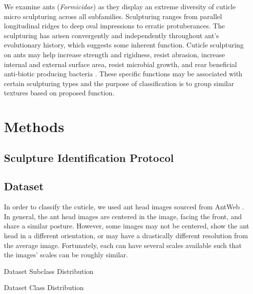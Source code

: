 \documentclass{aci}
\begin{document}
We examine ants (\textit{Formicidae}) as they display an extreme diversity of
cuticle micro sculpturing across all subfamilies. Sculpturing ranges from
parallel longitudinal ridges to deep oval impressions to erratic protuberances.
The sculpturing has arisen convergently and independently throughout ant’s
evolutionary history, which suggests some inherent function. Cuticle sculpturing
on ants may help increase strength and rigidness, resist abrasion, increase
internal and external surface area, resist microbial growth, and rear beneficial
anti-biotic producing bacteria \cite{johnson_effect_2011,
  bruckner_relationship_2017, currie_coevolved_2006}. These specific functions may
be associated with certain sculpturing types and the purpose of classification
is to group similar textures based on proposed function.

\section{Methods}

\subsection{Sculpture Identification Protocol}

\subsection{Dataset}
In order to classify the cuticle, we used ant head images sourced from AntWeb
\cite{antweb}. In general, the ant head images are centered in the image, facing
the front, and share a similar posture. However, some images may not be
centered, show the ant head in a different orientation, or may have a
drastically different resolution from the average image. Fortunately, each can
have several scales available such that the images' scales can be roughly
similar.

\begin{table}[h]
  \centering
  \caption{Dataset Subclass Distribution}
  \label{table:classdist_all_full}
  
\end{table}

\begin{table}[h]
  \centering
  \caption{Dataset Class Distribution}
  \label{table:classdist_rs_full}
  
\end{table}
\end{document}
